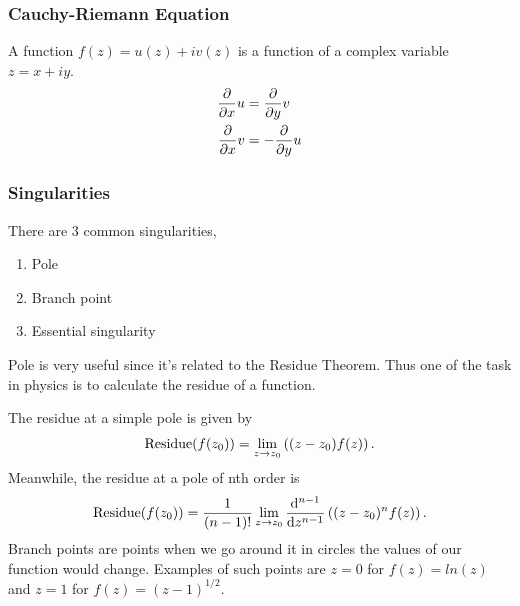 \documentclass[letterpaper,10pt,english]{sphinxmanual}
\begin{document}
\subsubsection{Cauchy-Riemann Equation}
\label{math:cauchy-riemann-equation}
A function \(f(z) = u(z) + i v(z)\) is a function of a complex variable \(z=x+i y\).
\begin{gather}
\begin{split}\frac{\partial}{\partial x} u &= \frac{\partial}{\partial y} v \\
\frac{\partial}{\partial x} v & = -\frac{\partial}{\partial y} u\end{split}\notag
\end{gather}

\subsubsection{Singularities}
\label{math:singularities}
There are 3 common singularities,
\begin{enumerate}
\item {} 
Pole

\item {} 
Branch point

\item {} 
Essential singularity

\end{enumerate}

Pole is very useful since it's related to the Residue Theorem. Thus one of the task in physics is to calculate the residue of a function.

The residue at a simple pole is given by
\begin{gather}
\begin{split}\text{Residue}(f(z_0)) = \lim_{z\to z_0}\left( (z-z_0)f(z) \right).\end{split}\notag
\end{gather}
Meanwhile, the residue at a pole of nth order is
\begin{gather}
\begin{split}\text{Residue}(f(z_0)) =  \frac{1}{(n-1)!} \lim_{z\to z_0} \frac{\mathrm d ^ {n-1}}{\mathrm d z^{n-1}}  \left( (z-z_0)^n f(z) \right).\end{split}\notag
\end{gather}
Branch points are points when we go around it in circles the values of our function would change. Examples of such points are \(z=0\) for \(f(z)=ln(z)\) and \(z=1\) for \(f(z)=(z-1)^{1/2}\).
\end{document}
